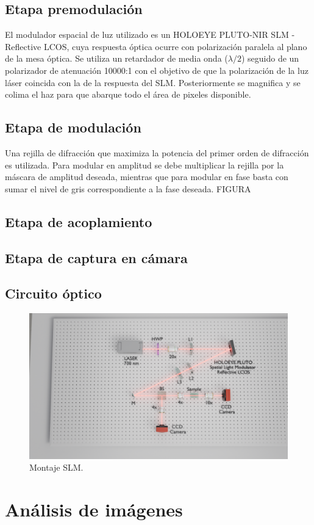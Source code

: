 \subsection{Etapa premodulación}
	El modulador espacial de luz utilizado es un HOLOEYE PLUTO-NIR SLM -  Reflective LCOS, cuya respuesta óptica ocurre con polarización paralela al plano de la mesa óptica. Se utiliza un retardador de media onda ($\lambda/2$) seguido de un polarizador de atenuación 10000:1 con el objetivo de que la polarización de la luz láser coincida con la de la respuesta del SLM. Posteriormente se magnifica y se colima el haz para que abarque todo el área de pixeles disponible.
\subsection{Etapa de modulación}
	Una rejilla de difracción que maximiza la potencia del primer orden de difracción es utilizada. Para modular en amplitud se debe multiplicar la rejilla por la máscara de amplitud deseada, mientras que para modular en fase basta con sumar el nivel de gris correspondiente a la fase deseada. FIGURA
\subsection{Etapa de acoplamiento}
\subsection{Etapa de captura en cámara}

\subsection{Circuito óptico}
\begin{figure}[H]
	\centering
	\includegraphics[width=\linewidth, trim={21cm 5cm 7cm 5cm},clip]{media/SLM_setup}
	\caption{Montaje SLM.}
\end{figure}
\section{Análisis de imágenes}


